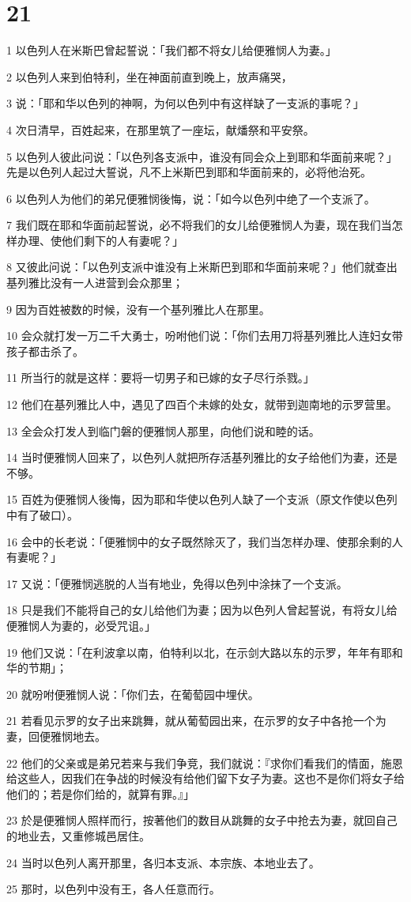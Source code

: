 \chapter{21}

\par 1 以色列人在米斯巴曾起誓说：「我们都不将女儿给便雅悯人为妻。」
\par 2 以色列人来到伯特利，坐在神面前直到晚上，放声痛哭，
\par 3 说：「耶和华以色列的神啊，为何以色列中有这样缺了一支派的事呢？」
\par 4 次日清早，百姓起来，在那里筑了一座坛，献燔祭和平安祭。
\par 5 以色列人彼此问说：「以色列各支派中，谁没有同会众上到耶和华面前来呢？」先是以色列人起过大誓说，凡不上米斯巴到耶和华面前来的，必将他治死。
\par 6 以色列人为他们的弟兄便雅悯後悔，说：「如今以色列中绝了一个支派了。
\par 7 我们既在耶和华面前起誓说，必不将我们的女儿给便雅悯人为妻，现在我们当怎样办理、使他们剩下的人有妻呢？」
\par 8 又彼此问说：「以色列支派中谁没有上米斯巴到耶和华面前来呢？」他们就查出基列雅比没有一人进营到会众那里；
\par 9 因为百姓被数的时候，没有一个基列雅比人在那里。
\par 10 会众就打发一万二千大勇士，吩咐他们说：「你们去用刀将基列雅比人连妇女带孩子都击杀了。
\par 11 所当行的就是这样：要将一切男子和已嫁的女子尽行杀戮。」
\par 12 他们在基列雅比人中，遇见了四百个未嫁的处女，就带到迦南地的示罗营里。
\par 13 全会众打发人到临门磐的便雅悯人那里，向他们说和睦的话。
\par 14 当时便雅悯人回来了，以色列人就把所存活基列雅比的女子给他们为妻，还是不够。
\par 15 百姓为便雅悯人後悔，因为耶和华使以色列人缺了一个支派（原文作使以色列中有了破口）。
\par 16 会中的长老说：「便雅悯中的女子既然除灭了，我们当怎样办理、使那余剩的人有妻呢？」
\par 17 又说：「便雅悯逃脱的人当有地业，免得以色列中涂抹了一个支派。
\par 18 只是我们不能将自己的女儿给他们为妻；因为以色列人曾起誓说，有将女儿给便雅悯人为妻的，必受咒诅。」
\par 19 他们又说：「在利波拿以南，伯特利以北，在示剑大路以东的示罗，年年有耶和华的节期」；
\par 20 就吩咐便雅悯人说：「你们去，在葡萄园中埋伏。
\par 21 若看见示罗的女子出来跳舞，就从葡萄园出来，在示罗的女子中各抢一个为妻，回便雅悯地去。
\par 22 他们的父亲或是弟兄若来与我们争竞，我们就说：『求你们看我们的情面，施恩给这些人，因我们在争战的时候没有给他们留下女子为妻。这也不是你们将女子给他们的；若是你们给的，就算有罪。』」
\par 23 於是便雅悯人照样而行，按著他们的数目从跳舞的女子中抢去为妻，就回自己的地业去，又重修城邑居住。
\par 24 当时以色列人离开那里，各归本支派、本宗族、本地业去了。
\par 25 那时，以色列中没有王，各人任意而行。


